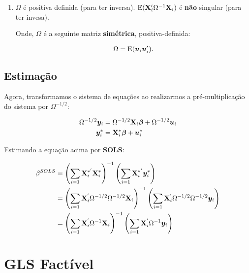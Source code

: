 \documentclass[11pt, oneside, a4paper, article]{article}
\numberwithin{equation}{section}
\begin{document}
\begin{description}
\begin{enumerate}
		\item %

			$\Omega$ é positiva definida (para ter inversa).
			$\text{E}(\mathbf{X}_{i}^{\prime} \Omega^{-1} \mathbf{X}_{i})$ é \textbf{não} singular (para ter invesa).

			Onde, $\Omega$ é a seguinte matriz \textbf{simétrica}, positiva-definida:

			\vspace{-1.5 em}
			\begin{align*}
				\Omega = \text{E}(\boldsymbol{u}_{i} \boldsymbol{u}_{i}^{\prime}).
			\end{align*}
	\end{enumerate}

	\subsection{Estimação}

	Agora, transformamos o sistema de equações ao realizarmos a pré-multiplicação do sistema por $\Omega^{-1/2}$:

	\vspace{-1.5 em}
	\begin{align*}
		\Omega^{-1/2} \boldsymbol{y}_{i} 
		&=
		\Omega^{-1/2} \mathbf{X}_{i} \boldsymbol{\beta}
		+
		\Omega^{-1/2} \boldsymbol{u}_{i}
		\\
		\boldsymbol{y}_{i}^{*}
		&=
		\mathbf{X}_{i}^{*} \boldsymbol{\beta}
		+
		\boldsymbol{u}^{*}_{i}
	\end{align*}

	Estimando a equação acima por \textbf{SOLS}:

	\vspace{-1.5 em}
	\begin{align*}
		\beta^{SOLS}
		&=
		\left( \sum_{i=1} \mathbf{X}_{i}^{*'} \mathbf{X}_{i}^{*} \right)^{-1}
		\left( \sum_{i=1} \mathbf{X}_{i}^{*'} \boldsymbol{y}_{i}^{*} \right)
		\\
		&=
		\left( \sum_{i=1} \mathbf{X}_{i}^{'} \Omega^{-1/2} \Omega^{-1/2} \mathbf{X}_{i} \right)^{-1}
		\left( \sum_{i=1} \mathbf{X}_{i}^{'} \Omega^{-1/2} \Omega^{-1/2} \boldsymbol{y}_{i} \right)
		\\
		&=
		\left( \sum_{i=1} \mathbf{X}_{i}^{'} \Omega^{-1} \mathbf{X}_{i} \right)^{-1}
		\left( \sum_{i=1} \mathbf{X}_{i}^{'} \Omega^{-1} \boldsymbol{y}_{i} \right)
	\end{align*}


	\clearpage
	\section{GLS Factível}


\end{description}
\end{document}
